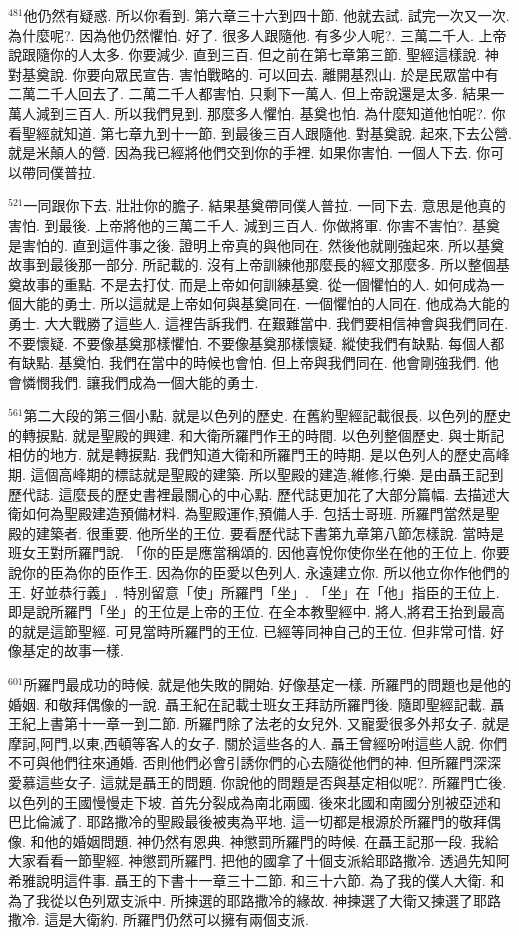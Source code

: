 \documentclass{book}
\begin{document}
$^{481}$他仍然有疑惑.
所以你看到.
第六章三十六到四十節.
他就去試.
試完一次又一次.
為什麼呢?.
因為他仍然懼怕.
好了.
很多人跟隨他.
有多少人呢?.
三萬二千人.
上帝說跟隨你的人太多.
你要減少.
直到三百.
但之前在第七章第三節.
聖經這樣說.
神對基奠說.
你要向眾民宣告.
害怕戰略的.
可以回去.
離開基烈山.
於是民眾當中有二萬二千人回去了.
二萬二千人都害怕.
只剩下一萬人.
但上帝說還是太多.
結果一萬人減到三百人.
所以我們見到.
那麼多人懼怕.
基奠也怕.
為什麼知道他怕呢?.
你看聖經就知道.
第七章九到十一節.
到最後三百人跟隨他.
對基奠說.
起來,下去公營.
就是米顛人的營.
因為我已經將他們交到你的手裡.
如果你害怕.
一個人下去.
你可以帶同僕普拉.

$^{521}$一同跟你下去.
壯壯你的膽子.
結果基奠帶同僕人普拉.
一同下去.
意思是他真的害怕.
到最後.
上帝將他的三萬二千人.
減到三百人.
你做將軍.
你害不害怕?.
基奠是害怕的.
直到這件事之後.
證明上帝真的與他同在.
然後他就剛強起來.
所以基奠故事到最後那一部分.
所記載的.
沒有上帝訓練他那麼長的經文那麼多.
所以整個基奠故事的重點.
不是去打仗.
而是上帝如何訓練基奠.
從一個懼怕的人.
如何成為一個大能的勇士.
所以這就是上帝如何與基奠同在.
一個懼怕的人同在.
他成為大能的勇士.
大大戰勝了這些人.
這裡告訴我們.
在艱難當中.
我們要相信神會與我們同在.
不要懷疑.
不要像基奠那樣懼怕.
不要像基奠那樣懷疑.
縱使我們有缺點.
每個人都有缺點.
基奠怕.
我們在當中的時候也會怕.
但上帝與我們同在.
他會剛強我們.
他會憐憫我們.
讓我們成為一個大能的勇士.

$^{561}$第二大段的第三個小點.
就是以色列的歷史.
在舊約聖經記載很長.
以色列的歷史的轉捩點.
就是聖殿的興建.
和大衛所羅門作王的時間.
以色列整個歷史.
與士斯記相仿的地方.
就是轉捩點.
我們知道大衛和所羅門王的時期.
是以色列人的歷史高峰期.
這個高峰期的標誌就是聖殿的建築.
所以聖殿的建造,維修,行樂.
是由聶王記到歷代誌.
這麼長的歷史書裡最關心的中心點.
歷代誌更加花了大部分篇幅.
去描述大衛如何為聖殿建造預備材料.
為聖殿運作,預備人手.
包括士哥班.
所羅門當然是聖殿的建築者.
很重要.
他所坐的王位.
要看歷代誌下書第九章第八節怎樣說.
當時是班女王對所羅門說.
「你的臣是應當稱頌的.
因他喜悅你使你坐在他的王位上.
你要說你的臣為你的臣作王.
因為你的臣愛以色列人.
永遠建立你.
所以他立你作他們的王.
好並恭行義」.
特別留意「使」所羅門「坐」.
「坐」在「他」指臣的王位上.
即是說所羅門「坐」的王位是上帝的王位.
在全本教聖經中.
將人,將君王抬到最高的就是這節聖經.
可見當時所羅門的王位.
已經等同神自己的王位.
但非常可惜.
好像基定的故事一樣.

$^{601}$所羅門最成功的時候.
就是他失敗的開始.
好像基定一樣.
所羅門的問題也是他的婚姻.
和敬拜偶像的一說.
聶王紀在記載士班女王拜訪所羅門後.
隨即聖經記載.
聶王紀上書第十一章一到二節.
所羅門除了法老的女兒外.
又寵愛很多外邦女子.
就是摩訶,阿門,以東,西頓等客人的女子.
關於這些各的人.
聶王曾經吩咐這些人說.
你們不可與他們往來通婚.
否則他們必會引誘你們的心去隨從他們的神.
但所羅門深深愛慕這些女子.
這就是聶王的問題.
你說他的問題是否與基定相似呢?.
所羅門亡後.
以色列的王國慢慢走下坡.
首先分裂成為南北兩國.
後來北國和南國分別被亞述和巴比倫滅了.
耶路撒冷的聖殿最後被夷為平地.
這一切都是根源於所羅門的敬拜偶像.
和他的婚姻問題.
神仍然有恩典.
神懲罰所羅門的時候.
在聶王記那一段.
我給大家看看一節聖經.
神懲罰所羅門.
把他的國拿了十個支派給耶路撒冷.
透過先知阿希雅說明這件事.
聶王的下書十一章三十二節.
和三十六節.
為了我的僕人大衛.
和為了我從以色列眾支派中.
所揀選的耶路撒冷的緣故.
神揀選了大衛又揀選了耶路撒冷.
這是大衛約.
所羅門仍然可以擁有兩個支派.
\end{document}

